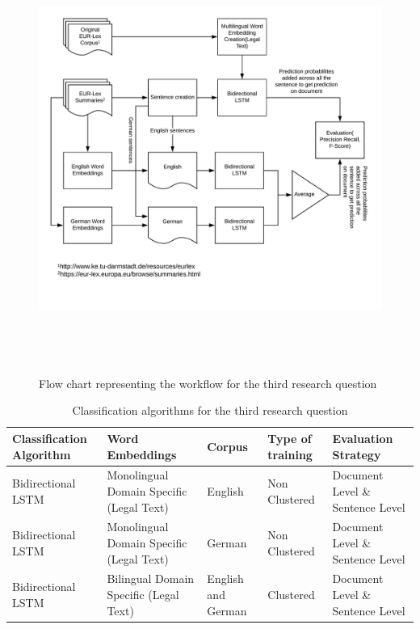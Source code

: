 \begin{figure}[!ht]
    \centering
    \includegraphics[width=15cm, height=14cm,keepaspectratio]{pics/flowforQuestion3.jpeg}
    \caption{Flow chart representing the workflow for the third research question}
    \label{fig:FlowResearchQuestion3}
\end{figure}

\begin{table}[!ht]
\begin{tabular}{>{\centering\arraybackslash}m{2.9cm}>{\centering\arraybackslash}m{2.9cm}>{\centering\arraybackslash}m{2cm}>{\centering\arraybackslash}m{2cm}>{\centering\arraybackslash}m{2.6cm}}
\hline
\textbf{Classification Algorithm} & \textbf{Word Embeddings} & \textbf{Corpus} & \textbf{Type of training} & \textbf{Evaluation Strategy} \\ \hline
Bidirectional LSTM & Monolingual Domain Specific (Legal Text) & English & Non Clustered & Document Level \&  Sentence Level \\ [0.2cm]
Bidirectional LSTM & Monolingual Domain Specific (Legal Text) & German & Non Clustered & Document Level \&  Sentence Level \\[0.2cm]

Bidirectional LSTM & Bilingual Domain Specific (Legal Text) & English and German & Clustered & Document Level \&  Sentence Level \\ \hline
\end{tabular}
\caption{Classification algorithms for the third research question}
\label{table:ListQuestionThirdQuestion}
\end{table}


